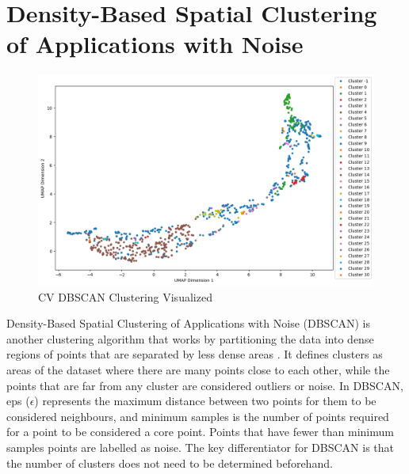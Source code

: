 \section{Density-Based Spatial Clustering of Applications with Noise}
\begin{figure}[h!]
  \centering
    \includegraphics[width=1.0\textwidth]{figures/dbscan.png}
    \caption{CV DBSCAN Clustering Visualized}
    \label{dbscan}
\end{figure}
Density-Based Spatial Clustering of Applications with Noise (DBSCAN) is another clustering algorithm that works by partitioning the data into dense regions of points that are separated by less dense areas \cite{Ester1996ADA}. It defines clusters as areas of the dataset where there are many points close to each other, while the points that are far from any cluster are considered outliers or noise. In DBSCAN, eps ($\epsilon$) represents the maximum distance between two points for them to be considered neighbours, and minimum samples is the number of points required for a point to be considered a core point. Points that have fewer than minimum samples points are labelled as noise. The key differentiator for DBSCAN is that the number of clusters does not need to be determined beforehand.  
